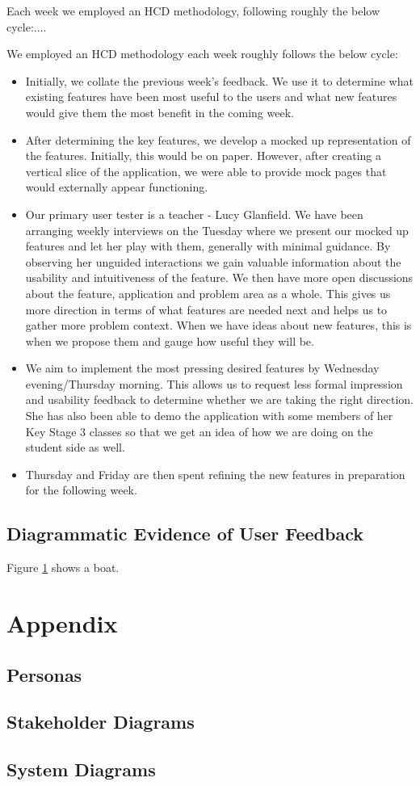 \documentclass[a4wide, 11pt]{article}
\begin{document}
Each week we employed an HCD methodology, following roughly the below cycle:....

We employed an HCD methodology each week roughly follows the below cycle:
\begin{itemize}
  \item Initially, we collate the previous week's feedback. We use it to determine what existing features have been most useful to the users and what new features would give them the most benefit in the coming week.
  \item After determining the key features, we develop a mocked up representation of the features. Initially, this would be on paper. However, after creating a vertical slice of the application, we were able to provide mock pages that would externally appear functioning.
  \item Our primary user tester is a teacher - Lucy Glanfield. We have been arranging weekly interviews on the Tuesday where we present our mocked up features and let her play with them, generally with minimal guidance. By observing her unguided interactions we gain valuable information about the usability and intuitiveness of the feature. We then have more open discussions about the feature, application and problem area as a whole. This gives us more direction in terms of what features are needed next and helps us to gather more problem context. When we have ideas about new features, this is when we propose them and gauge how useful they will be.
  \item We aim to implement the most pressing desired features by Wednesday evening/Thursday morning. This allows us to request less formal impression and usability feedback to determine whether we are taking the right direction. She has also been able to demo the application with some members of her Key Stage 3 classes so that we get an idea of how we are doing on the student side as well.
  \item Thursday and Friday are then spent refining the new features in preparation for the following week.
\end{itemize}

\subsection{Diagrammatic Evidence of User Feedback}

Figure \ref{fig:mockup} shows a boat.

\begin{figure}
  \begin{center}
  \end{center}
  \label{fig:mockup}
\end{figure}


\section{Appendix}

\subsection{Personas}

\subsection{Stakeholder Diagrams}

\subsection{System Diagrams}
\end{document}
